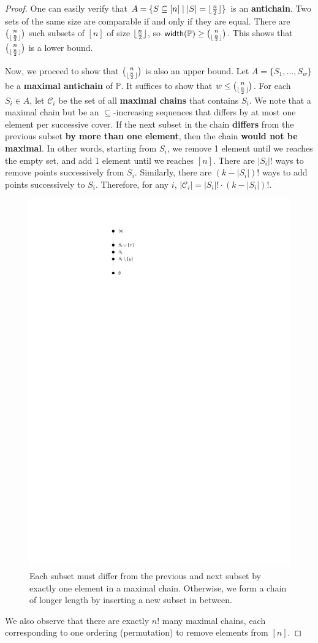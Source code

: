\begin{proof}
    One can easily verify that $A = \{ S \subseteq [n] \mid |S| = \lfloor\frac{n}{2}\rfloor\}$ is an \textbf{antichain}. Two sets of the same size are comparable if and only if they are equal. There are $\binom{n}{\lfloor\frac{n}{2}\rfloor}$ such subsets of $[n]$ of size $\lfloor\frac{n}{2}\rfloor$, so $\mathsf{width}(\mathbb{P}) \geq \binom{n}{\lfloor\frac{n}{2}\rfloor}$. This shows that $\binom{n}{\lfloor\frac{n}{2}\rfloor}$ is a lower bound.

    Now, we proceed to show that $\binom{n}{\lfloor\frac{n}{2}\rfloor}$ is also an upper bound. Let $A = \{ S_1, \ldots, S_w \}$ be a \textbf{maximal antichain} of $\mathbb{P}$. It suffices to show that $w \leq \binom{n}{\lfloor\frac{n}{2}\rfloor}$. For each $S_i \in A$, let $\mathcal{C}_i$ be the set of all \textbf{maximal chains} that contains $S_i$. We note that a maximal chain but be an $\subseteq$-increasing sequences that differs by at most one element per successive cover. If the next subset in the chain \textbf{differs} from the previous subset \textbf{by more than one element}, then the chain \textbf{would not be maximal}. In other words, starting from $S_i$, we remove 1 element until we reaches the empty set, and add 1 element until we reaches $[n]$. There are $|S_i|!$ ways to remove points successively from $S_i$. Similarly, there are $(k-|S_i|)!$ ways to add points successively to $S_i$. Therefore, for any $i$, $|\mathcal{C}_i| = |S_i|! \cdot (k-|S_i|)!$.

    \begin{figure}[htbp]
        \centering
        \includegraphics[width=0.1\linewidth]{figures/max-len-chain.pdf}
        \caption{Each subset must differ from the previous and next subset by exactly one element in a maximal chain. Otherwise, we form a chain of longer length by inserting a new subset in between.}
        \label{fig:max-len-chain}
    \end{figure}

    We also observe that there are exactly $n!$ many maximal chains, each corresponding to one ordering (permutation) to remove elements from $[n]$.


\end{proof}
